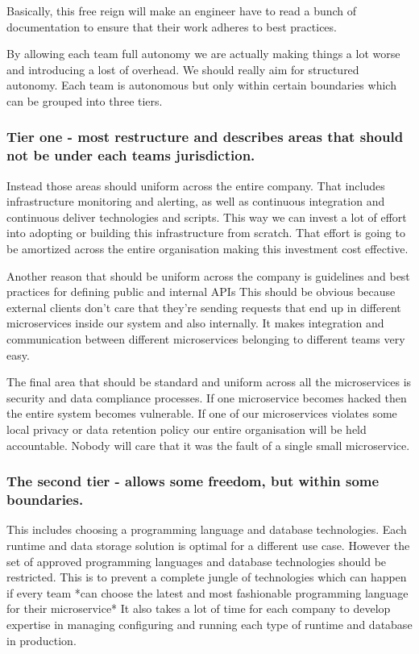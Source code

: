 \documentclass[a4paper, 11pt]{book}
\begin{document}
    Basically, this free reign will make an engineer have to read a bunch of documentation to ensure that their work adheres to best practices.

    By allowing each team full autonomy we are actually making things a lot worse and introducing a lost of overhead.
    We should really aim for structured autonomy.
    Each team is autonomous but only within certain boundaries which can be grouped into three tiers.

    \subsubsection{Tier one - most restructure and describes areas that should not be under each teams jurisdiction.}
    Instead those areas should uniform across the entire company.
    That includes infrastructure monitoring and alerting, as well as continuous integration and continuous deliver technologies and scripts.
    This way we can invest a lot of effort into adopting or building this infrastructure from scratch.
    That effort is going to be amortized across the entire organisation making this investment cost effective.

    Another reason that should be uniform across the company is guidelines and best practices for defining public and internal APIs
    This should be obvious because external clients don't care that they're sending requests that end up in different microservices inside our system and also internally.
    It makes integration and communication between different microservices belonging to different teams very easy.

    The final area that should be standard and uniform across all the microservices is security and data compliance processes.
    If one microservice becomes hacked then the entire system becomes vulnerable.
    If one of our microservices violates some local privacy or data retention policy our entire organisation will be held accountable.
    Nobody will care that it was the fault of a single small microservice.

    \subsubsection{The second tier - allows some freedom, but within some boundaries.}
    This includes choosing a programming language and database technologies.
    Each runtime and data storage solution is optimal for a different use case.
    However the set of approved programming languages and database technologies should be restricted.
    This is to prevent a complete jungle of technologies which can happen if every team *can choose the latest and most fashionable programming language for their microservice*
    It also takes a lot of time for each company to develop expertise in managing configuring and running each type of runtime and database in production.
\end{document}
